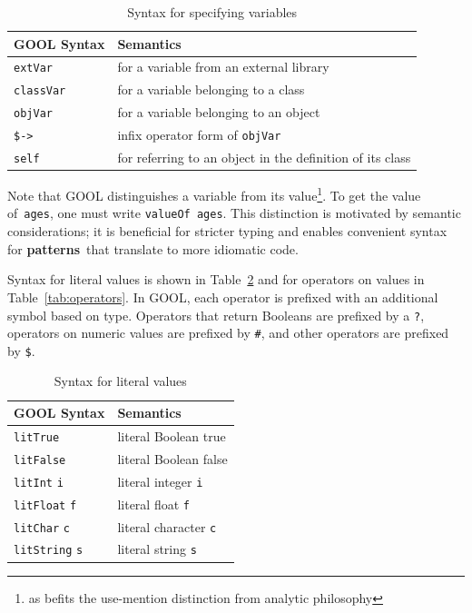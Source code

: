 \documentclass[sigplan,review,anonymous,prologue,dvipsnames]{acmart}
\newcommand{\abbrev}[1]{\textbf{#1}}
\newcommand{\oopatterns}{\abbrev{patterns}}
\begin{document}
\begin{table}[!h]
\caption{Syntax for specifying variables}
\begin{tabular}{p{} p{}}
  \textbf{GOOL Syntax} & \textbf{Semantics} \\
  \midrule
  \verb|extVar| & for a variable from an external library \\
  \verb|classVar| & for a variable belonging to a class \\
  \verb|objVar| & for a variable belonging to an object \\
  \verb|$->| & infix operator form of \verb|objVar| \\
  \verb|self| & for referring to an object in the definition of its class \\
\end{tabular}
\label{tab:variables}
\end{table}

Note that GOOL distinguishes a variable from its value\footnote{
as befits the use-mention distinction from analytic philosophy}. To get
the value of~\verb|ages|, one must write \verb|valueOf ages|. This distinction 
is motivated by semantic considerations; it is beneficial for stricter typing 
and enables convenient syntax for \oopatterns~that translate to more idiomatic
code.

Syntax for literal values is shown in Table~\ref{tab:literals} and for
operators on values in Table~\ref{tab:operators}. In GOOL, each
operator is prefixed with an additional symbol based on type. Operators that
return Booleans are prefixed by a \verb|?|, operators on numeric values are
prefixed by \verb|#|, and other operators are prefixed by \verb|$|.

\begin{table}[!h]
  \caption{Syntax for literal values}
  \begin{tabular}{p{} p{}}
    \textbf{GOOL Syntax} & \textbf{Semantics} \\
    \midrule
    \verb|litTrue| & literal Boolean true \\
    \verb|litFalse| & literal Boolean false \\
    \verb|litInt| \verb|i| & literal integer \verb|i| \\
    \verb|litFloat| \verb|f| & literal float \verb|f| \\
    \verb|litChar| \verb|c| & literal character \verb|c| \\
    \verb|litString| \verb|s| & literal string \verb|s| \\
  \end{tabular}
  \label{tab:literals}
\end{table}
\end{document}
